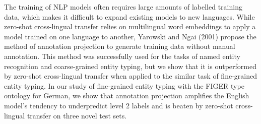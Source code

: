 The training of NLP models often requires large amounts of labelled training data, which makes it difficult to expand existing models to new languages. While zero-shot cross-lingual transfer relies on multilingual word embeddings to apply a model trained on one language to another, Yarowski and Ngai (2001) propose the method of annotation projection to generate training data without manual annotation. This method was successfully used for the tasks of named entity recognition and coarse-grained entity typing, but we show that it is outperformed by zero-shot cross-lingual transfer when applied to the similar task of fine-grained entity typing. In our study of fine-grained entity typing with the FIGER type ontology for German, we show that annotation projection amplifies the English model's tendency to underpredict level 2 labels and is beaten by zero-shot cross-lingual transfer on three novel test sets.
